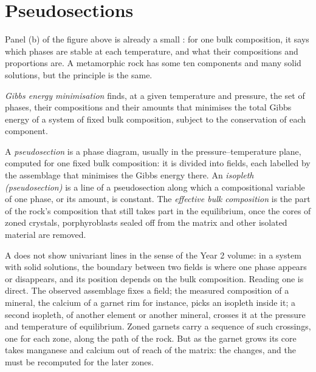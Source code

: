 \section{Pseudosections}\label{sec:b3:petrological-thermodynamics:pseudosections}

Panel (b) of the figure above is already a small : for one bulk
composition, it says which phases are stable at each temperature, and what
their compositions and proportions are. A metamorphic rock has some ten
components and many solid solutions, but the principle is the same.

\begin{definition}\label{def:b3:petrological-thermodynamics:minimisation}
\emph{Gibbs energy minimisation} finds, at a
given temperature and pressure, the set of phases, their compositions and
their amounts that minimises the total Gibbs energy of a system of fixed bulk
composition, subject to the conservation of each component.
\end{definition}

\begin{definition}\label{def:b3:petrological-thermodynamics:pseudosection}
A \emph{pseudosection} is a phase diagram, usually in
the pressure--temperature plane, computed for one fixed bulk composition: it
is divided into fields, each labelled by the assemblage that minimises the
Gibbs energy there. An \emph{isopleth (pseudosection)}
is a line of a pseudosection along which a compositional
variable of one phase, or its amount, is constant. The \emph{effective bulk
composition} is the part of the rock's
composition that still takes part in the equilibrium, once the cores of zoned
crystals, porphyroblasts sealed off from the matrix and other isolated
material are removed.
\end{definition}

A  does not show univariant lines in the sense of the Year 2
volume: in a system with solid solutions, the boundary between two fields is
where one phase appears or disappears, and its position depends on the bulk
composition. Reading one is direct. The observed assemblage fixes a field;
the measured composition of a mineral, the calcium of a garnet rim for
instance, picks an isopleth inside it; a second isopleth, of another element
or another mineral, crosses it at the pressure and temperature of
equilibrium. Zoned garnets carry a sequence of such crossings, one for each
zone, along the path of the rock. But as the garnet grows its core takes
manganese and calcium out of reach of the matrix: the  changes, and the  must be recomputed for the
later zones.

